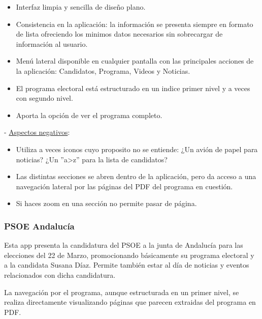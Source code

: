 \begin{itemize}
	\item Interfaz limpia y sencilla de diseño plano.
	\item Consistencia en la aplicación: la información se presenta siempre en formato de lista ofreciendo los minimos datos necesarios sin sobrecargar de información al usuario.
	\item Menú lateral disponible en cualquier pantalla con las principales acciones de la aplicación: Candidatos, Programa, Videos y Noticias.
	\item El programa electoral está estructurado en un indice primer nivel y a veces con segundo nivel.
	\item Aporta la opción de ver el programa completo. 
\end{itemize}

 - \underline{Aspectos negativos}:

\begin{itemize}
	\item Utiliza a veces iconos cuyo proposito no se entiende: ¿Un avión de papel para noticias? ¿Un ''a>z'' para la lista de candidatos?
	\item Las distintas secciones se abren dentro de la aplicación, pero da acceso a una navegación lateral por las páginas del PDF del programa en cuestión.
	\item Si haces zoom en una sección no permite pasar de página.
\end{itemize}

\subsubsection{PSOE Andalucía}

Esta app presenta la candidatura del PSOE a la junta de Andalucía para las elecciones del 22 de Marzo, promocionando básicamente su programa electoral y a la candidata Susana Díaz. Permite también estar al día de noticias y eventos relacionados con dicha candidatura.

La navegación por el programa, aunque estructurada en un primer nivel, se realiza directamente visualizando páginas que parecen extraidas del programa en PDF.

